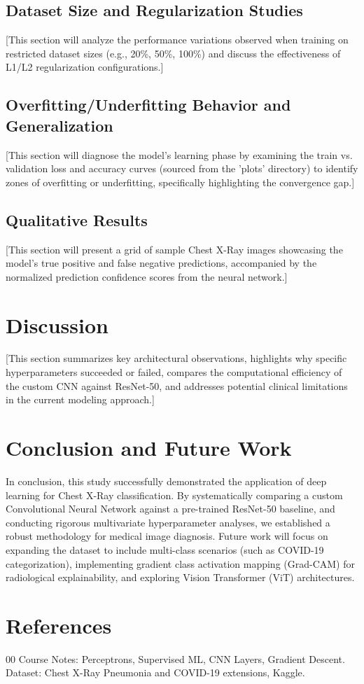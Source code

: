 \documentclass[conference]{IEEEtran}
\begin{document}
\subsection{Dataset Size and Regularization Studies}
[This section will analyze the performance variations observed when training on restricted dataset sizes (e.g., 20\%, 50\%, 100\%) and discuss the effectiveness of L1/L2 regularization configurations.]

\subsection{Overfitting/Underfitting Behavior and Generalization}
[This section will diagnose the model's learning phase by examining the train vs. validation loss and accuracy curves (sourced from the 'plots' directory) to identify zones of overfitting or underfitting, specifically highlighting the convergence gap.]

\subsection{Qualitative Results}
[This section will present a grid of sample Chest X-Ray images showcasing the model's true positive and false negative predictions, accompanied by the normalized prediction confidence scores from the neural network.]

\section{Discussion}
[This section summarizes key architectural observations, highlights why specific hyperparameters succeeded or failed, compares the computational efficiency of the custom CNN against ResNet-50, and addresses potential clinical limitations in the current modeling approach.]

\section{Conclusion and Future Work}
In conclusion, this study successfully demonstrated the application of deep learning for Chest X-Ray classification. By systematically comparing a custom Convolutional Neural Network against a pre-trained ResNet-50 baseline, and conducting rigorous multivariate hyperparameter analyses, we established a robust methodology for medical image diagnosis. Future work will focus on expanding the dataset to include multi-class scenarios (such as COVID-19 categorization), implementing gradient class activation mapping (Grad-CAM) for radiological explainability, and exploring Vision Transformer (ViT) architectures.

\section*{References}

\begin{thebibliography}{00}
 Course Notes: Perceptrons, Supervised ML, CNN Layers, Gradient Descent.
 Dataset: Chest X-Ray Pneumonia and COVID-19 extensions, Kaggle.
\end{thebibliography}
\end{document}

